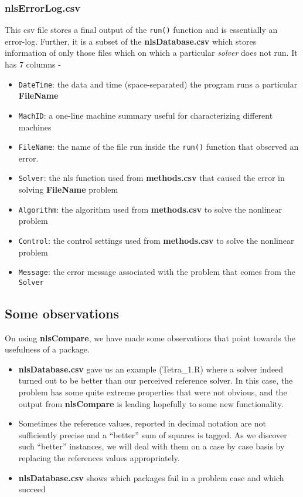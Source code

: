 \hypertarget{nlserrorlog.csv}{%
\subsubsection{nlsErrorLog.csv}\label{nlserrorlog.csv}}

This csv file stores a final output of the \texttt{run()} function and
is essentially an error-log. Further, it is a subset of the
\textbf{nlsDatabase.csv} which stores information of only those files
which on which a particular \emph{solver} does not run. It has 7 columns
-

\begin{itemize}
\tightlist
\item
  \texttt{DateTime}: the data and time (space-separated) the program
  runs a particular \textbf{FileName}
\item
  \texttt{MachID}: a one-line machine summary useful for characterizing
  different machines
\item
  \texttt{FileName}: the name of the file run inside the \texttt{run()}
  function that observed an error.
\item
  \texttt{Solver}: the nls function used from \textbf{methods.csv} that
  caused the error in solving \textbf{FileName} problem
\item
  \texttt{Algorithm}: the algorithm used from \textbf{methods.csv} to
  solve the nonlinear problem
\item
  \texttt{Control}: the control settings used from \textbf{methods.csv}
  to solve the nonlinear problem
\item
  \texttt{Message}: the error message associated with the problem that
  comes from the \texttt{Solver}
\end{itemize}

\hypertarget{some-observations}{%
\subsection{Some observations}\label{some-observations}}

On using \textbf{nlsCompare}, we have made some observations that point
towards the usefulness of a package.

\begin{itemize}
\tightlist
\item
  \textbf{nlsDatabase.csv} gave us an example (Tetra\_1.R) where a
  solver indeed turned out to be better than our perceived reference
  solver. In this case, the problem has some quite extreme properties
  that were not obvious, and the output from \textbf{nlsCompare} is
  leading hopefully to some new functionality.
\item
  Sometimes the reference values, reported in decimal notation are not
  sufficiently precise and a ``better'' sum of squares is tagged. As we
  discover such ``better'' instances, we will deal with them on a case
  by case basis by replacing the references values appropriately.
\item
  \textbf{nlsDatabase.csv} shows which packages fail in a problem case
  and which succeed
\end{itemize}

